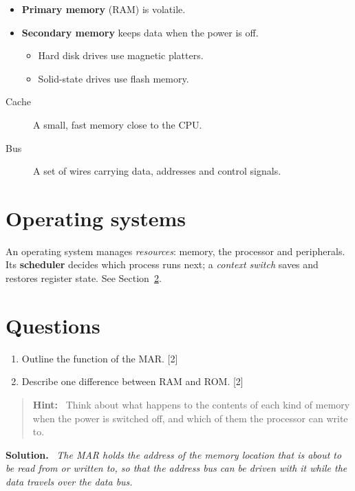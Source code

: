\documentclass[11pt]{article}
\newenvironment{solution}{\par\noindent\textbf{Solution.}\ \itshape}{\par}
\newenvironment{hint}{\begin{quote}\small\textbf{Hint:}\ }{\end{quote}}
\begin{document}
\begin{itemize}[noitemsep]
  \item \textbf{Primary memory} (RAM) is volatile.
  \item \textbf{Secondary memory} keeps data when the power is off.
  \begin{itemize}
    \item Hard disk drives use magnetic platters.
    \item Solid-state drives use flash memory.
  \end{itemize}
\end{itemize}

\begin{description}
  \item[Cache] A small, fast memory close to the CPU.
  \item[Bus] A set of wires carrying data, addresses and control signals.
\end{description}

\newpage
\section{Operating systems}
An operating system manages \textit{resources}: memory, the processor and peripherals. Its \textbf{scheduler} decides which process runs next; a \emph{context switch} saves and restores register state. See Section~\ref{sec:q}.

\section{Questions}\label{sec:q}
\begin{enumerate}[leftmargin=*]
  \item Outline the function of the MAR. \hfill [2]
  \item Describe one difference between RAM and ROM. \hfill [2]
\end{enumerate}

\begin{hint}
  Think about what happens to the contents of each kind of memory when the power is switched off, and which of them the processor can write to.
\end{hint}

\begin{solution}
The MAR holds the address of the memory location that is about to be read from or written to, so that the address bus can be driven with it while the data travels over the data bus.
\end{solution}
\end{document}
